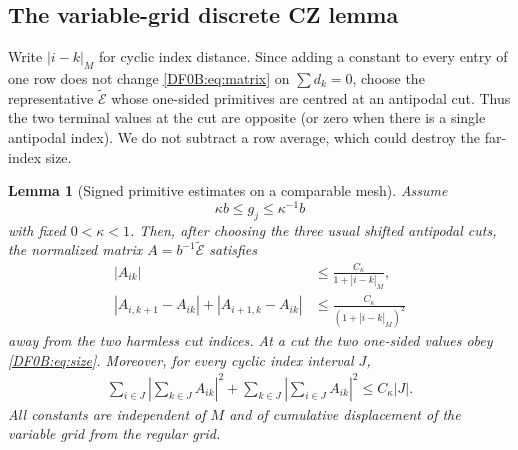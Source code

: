 \documentclass[11pt]{amsart}
\numberwithin{equation}{section}
\newtheorem{lemma}[theorem]{Lemma}
\theoremstyle{definition}
\theoremstyle{remark}
\begin{document}
\subsection{The variable-grid discrete CZ lemma}

Write $|i-k|_M$ for cyclic index distance.  Since adding a constant to
every entry of one row does not change \eqref{DF0B:eq:matrix} on
$\sum d_k=0$, choose the representative
$\widetilde{\mathcal E}$ whose one-sided primitives are centred at an
antipodal cut.  Thus the two terminal values at the cut are opposite (or
zero when there is a single antipodal index).  We do not subtract a row
average, which could destroy the far-index size.

\begin{lemma}[Signed primitive estimates on a comparable mesh]
\label{DF0B:lem:kernel}
Assume
\begin{equation}\label{DF0B:eq:current-comparable}
 \kappa b\le g_j\le\kappa^{-1}b
\end{equation}
with fixed $0<\kappa<1$.  Then, after choosing the three usual shifted
antipodal cuts, the normalized matrix
$A=b^{-1}\widetilde{\mathcal E}$ satisfies
\begin{align}
 |A_{ik}|&\le\frac{C_\kappa}{1+|i-k|_M},\label{DF0B:eq:size}\\
 |A_{i,k+1}-A_{ik}|+|A_{i+1,k}-A_{ik}|
 &\le\frac{C_\kappa}{(1+|i-k|_M)^2}
 \label{DF0B:eq:smooth}
\end{align}
away from the two harmless cut indices.  At a cut the two one-sided
values obey \eqref{DF0B:eq:size}.  Moreover, for every cyclic index interval
$J$,
\begin{multline}\label{DF0B:eq:testing}
 \sum_{i\in J}\left|\sum_{k\in J}A_{ik}\right|^2
 +\sum_{k\in J}\left|\sum_{i\in J}A_{ik}\right|^2
 \le C_\kappa|J|.
\end{multline}
All constants are independent of $M$ and of cumulative displacement of
the variable grid from the regular grid.
\end{lemma}
\end{document}
